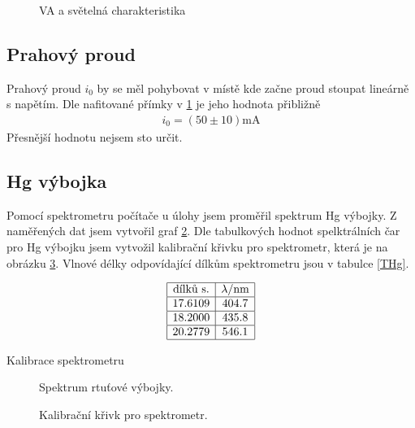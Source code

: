 \documentclass[a4paper,12pt]{article}
\begin{document}
\begin{figure}
\begin{center}

\end{center}
\caption{VA a světelná charakteristika}
\label{g1}
\end{figure}

\subsection{Prahový proud}
Prahový proud $i_0$ by se měl pohybovat v místě kde začne proud stoupat lineárně s napětím. Dle nafitované přímky v \ref{g1} je jeho hodnota přibližně
\begin{eqnarray}
i_0=(50\pm 10) \mbox{mA}
\end{eqnarray}
Přesnější hodnotu nejsem sto určit.

\subsection{Hg výbojka}
Pomocí spektrometru počítače u úlohy jsem proměřil spektrum Hg výbojky. Z naměřených dat jsem vytvořil graf \ref{g2}. Dle tabulkových hodnot spelktrálních čar pro Hg výbojku jsem vytvožil kalibrační křivku pro spektrometr, která je na obrázku \ref{g3}. Vlnové délky odpovídající dílkům spektrometru jsou v tabulce \ref{THg}. 

\begin{table}
$$
\begin{array}{|c|c|}
\hline
\mbox{dílků s.}&   \lambda/\mbox{nm} \\ \hline
17.6109&    404.7 \\ \hline
18.2000&    435.8 \\ \hline
20.2779&    546.1 \\ \hline
\end{array}
$$
\caption{Kalibrace spektrometru}
\label{THg}
\end{table}

\begin{figure}
\begin{center}

\end{center}
\caption{Spektrum rtuťové výbojky.}
\label{g2}
\end{figure}

\begin{figure}
\begin{center}

\end{center}
\caption{Kalibrační křivk pro spektrometr.}
\label{g3}
\end{figure}
\end{document}
